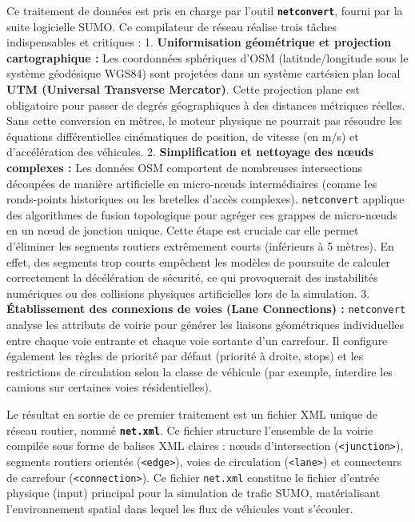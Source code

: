 \documentclass[10pt, a4paper]{article}
\begin{document}
Ce traitement de données est pris en charge par l'outil
\textbf{\texttt{netconvert}}, fourni par la suite logicielle SUMO. Ce
compilateur de réseau réalise trois tâches indispensables et critiques :
1. \textbf{Uniformisation géométrique et projection cartographique :}
Les coordonnées sphériques d'OSM (latitude/longitude sous le système
géodésique WGS84) sont projetées dans un système cartésien plan local
\textbf{UTM (Universal Transverse Mercator)}. Cette projection plane est
obligatoire pour passer de degrés géographiques à des distances
métriques réelles. Sans cette conversion en mètres, le moteur physique
ne pourrait pas résoudre les équations différentielles cinématiques de
position, de vitesse (en m/s) et d'accélération des véhicules. 2.
\textbf{Simplification et nettoyage des nœuds complexes :} Les données
OSM comportent de nombreuses intersections découpées de manière
artificielle en micro-nœuds intermédiaires (comme les ronds-points
historiques ou les bretelles d'accès complexes). \texttt{netconvert}
applique des algorithmes de fusion topologique pour agréger ces grappes
de micro-nœuds en un nœud de jonction unique. Cette étape est cruciale
car elle permet d'éliminer les segments routiers extrêmement courts
(inférieurs à 5 mètres). En effet, des segments trop courts empêchent
les modèles de poursuite de calculer correctement la décélération de
sécurité, ce qui provoquerait des instabilités numériques ou des
collisions physiques artificielles lors de la simulation. 3.
\textbf{Établissement des connexions de voies (Lane Connections) :}
\texttt{netconvert} analyse les attributs de voirie pour générer les
liaisons géométriques individuelles entre chaque voie entrante et chaque
voie sortante d'un carrefour. Il configure également les règles de
priorité par défaut (priorité à droite, stops) et les restrictions de
circulation selon la classe de véhicule (par exemple, interdire les
camions sur certaines voies résidentielles).

Le résultat en sortie de ce premier traitement est un fichier XML unique
de réseau routier, nommé \textbf{\texttt{net.xml}}. Ce fichier structure
l'ensemble de la voirie compilée sous forme de balises XML claires :
nœuds d'intersection (\texttt{\textless{}junction\textgreater{}}),
segments routiers orientés (\texttt{\textless{}edge\textgreater{}}),
voies de circulation (\texttt{\textless{}lane\textgreater{}}) et
connecteurs de carrefour (\texttt{\textless{}connection\textgreater{}}).
Ce fichier \texttt{net.xml} constitue le fichier d'entrée physique
(input) principal pour la simulation de trafic SUMO, matérialisant
l'environnement spatial dans lequel les flux de véhicules vont
s'écouler.
\end{document}
